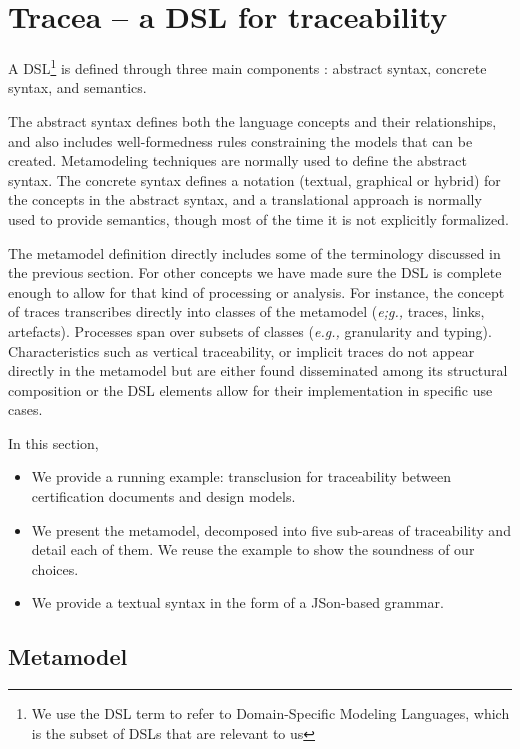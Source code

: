 \section{Tracea -- a DSL for traceability}
A DSL\footnote{We use the DSL term to refer to Domain-Specific Modeling Languages, which is the subset of DSLs that are relevant to us} is defined through three main components \cite{kleppe2008-DSLs-with-metamodels}: abstract syntax, concrete syntax, and semantics. 

The abstract syntax defines both the language concepts and their relationships, and also includes well-formedness rules constraining the models that can be created. Metamodeling techniques are normally used to define the abstract syntax. The concrete syntax defines a notation (textual, graphical or hybrid) for the concepts in the abstract syntax, and a translational approach is normally used to provide semantics, though most of the time it is not explicitly formalized.

The metamodel definition directly includes some of the terminology discussed in the previous section. For other concepts we have made sure the DSL is complete enough to allow for that kind of processing or analysis. 
For instance, the concept of traces transcribes directly into classes of the metamodel (\textit{e;g.,} traces, links, artefacts). Processes span over subsets of classes (\textit{e.g.,} granularity and typing).
Characteristics such as vertical traceability, or implicit traces do not appear directly in the metamodel but are either found disseminated among its structural composition or the DSL elements allow for their implementation in specific use cases. 

In this section,
\begin{itemize}
    \item We provide a running example: transclusion for traceability between certification documents and design models.
    \item We present the metamodel, decomposed into five sub-areas of traceability and detail each of them. We reuse the example to show the soundness of our choices.
    \item We provide a textual syntax in the form of a {JSon-based grammar}. 
\end{itemize}



\subsection{Metamodel} 

